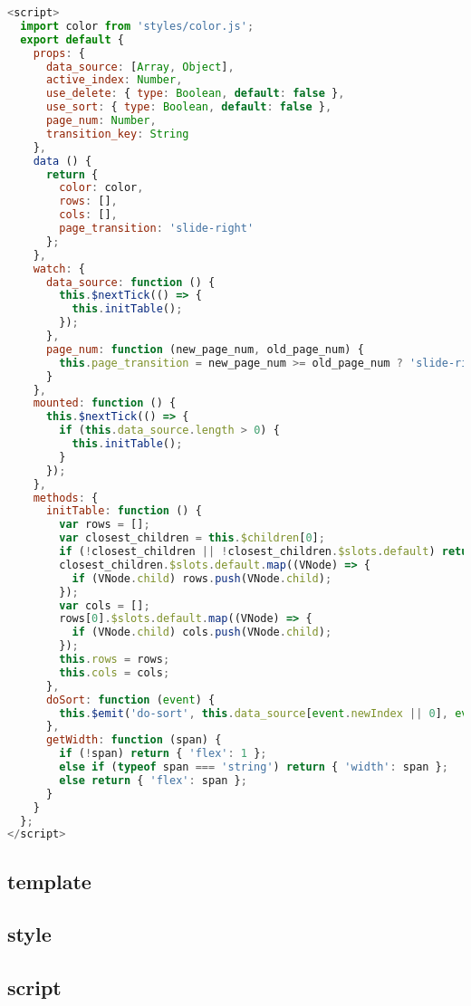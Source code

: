 \begin{lstlisting}[language=JavaScript]
<script>
  import color from 'styles/color.js';
  export default {
    props: {
      data_source: [Array, Object],
      active_index: Number,
      use_delete: { type: Boolean, default: false },
      use_sort: { type: Boolean, default: false },
      page_num: Number,
      transition_key: String
    },
    data () {
      return {
        color: color,
        rows: [],
        cols: [],
        page_transition: 'slide-right'
      };
    },
    watch: {
      data_source: function () {
        this.$nextTick(() => {
          this.initTable();
        });
      },
      page_num: function (new_page_num, old_page_num) {
        this.page_transition = new_page_num >= old_page_num ? 'slide-right' : 'slide-left';
      }
    },
    mounted: function () {
      this.$nextTick(() => {
        if (this.data_source.length > 0) {
          this.initTable();
        }
      });
    },
    methods: {
      initTable: function () {
        var rows = [];
        var closest_children = this.$children[0];
        if (!closest_children || !closest_children.$slots.default) return;
        closest_children.$slots.default.map((VNode) => {
          if (VNode.child) rows.push(VNode.child);
        });
        var cols = [];
        rows[0].$slots.default.map((VNode) => {
          if (VNode.child) cols.push(VNode.child);
        });
        this.rows = rows;
        this.cols = cols;
      },
      doSort: function (event) {
        this.$emit('do-sort', this.data_source[event.newIndex || 0], event.newIndex || 0, event.oldIndex);
      },
      getWidth: function (span) {
        if (!span) return { 'flex': 1 };
        else if (typeof span === 'string') return { 'width': span };
        else return { 'flex': span };
      }
    }
  };
</script>
\end{lstlisting}


\subsection{template}



\subsection{style}



\subsection{script}



